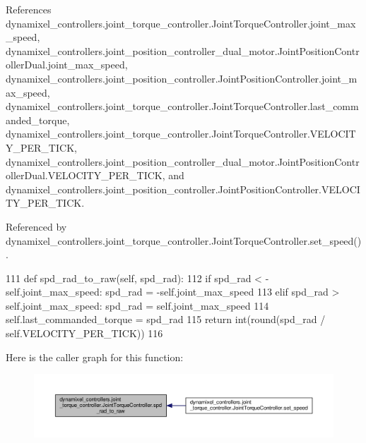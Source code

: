 References dynamixel\+\_\+controllers.\+joint\+\_\+torque\+\_\+controller.\+Joint\+Torque\+Controller.\+joint\+\_\+max\+\_\+speed, dynamixel\+\_\+controllers.\+joint\+\_\+position\+\_\+controller\+\_\+dual\+\_\+motor.\+Joint\+Position\+Controller\+Dual.\+joint\+\_\+max\+\_\+speed, dynamixel\+\_\+controllers.\+joint\+\_\+position\+\_\+controller.\+Joint\+Position\+Controller.\+joint\+\_\+max\+\_\+speed, dynamixel\+\_\+controllers.\+joint\+\_\+torque\+\_\+controller.\+Joint\+Torque\+Controller.\+last\+\_\+commanded\+\_\+torque, dynamixel\+\_\+controllers.\+joint\+\_\+torque\+\_\+controller.\+Joint\+Torque\+Controller.\+V\+E\+L\+O\+C\+I\+T\+Y\+\_\+\+P\+E\+R\+\_\+\+T\+I\+CK, dynamixel\+\_\+controllers.\+joint\+\_\+position\+\_\+controller\+\_\+dual\+\_\+motor.\+Joint\+Position\+Controller\+Dual.\+V\+E\+L\+O\+C\+I\+T\+Y\+\_\+\+P\+E\+R\+\_\+\+T\+I\+CK, and dynamixel\+\_\+controllers.\+joint\+\_\+position\+\_\+controller.\+Joint\+Position\+Controller.\+V\+E\+L\+O\+C\+I\+T\+Y\+\_\+\+P\+E\+R\+\_\+\+T\+I\+CK.



Referenced by dynamixel\+\_\+controllers.\+joint\+\_\+torque\+\_\+controller.\+Joint\+Torque\+Controller.\+set\+\_\+speed().


\begin{DoxyCode}
111     \textcolor{keyword}{def }spd\_rad\_to\_raw(self, spd\_rad):
112         \textcolor{keywordflow}{if} spd\_rad < -self.joint\_max\_speed: spd\_rad = -self.joint\_max\_speed
113         \textcolor{keywordflow}{elif} spd\_rad > self.joint\_max\_speed: spd\_rad = self.joint\_max\_speed
114         self.last\_commanded\_torque = spd\_rad
115         \textcolor{keywordflow}{return} int(round(spd\_rad / self.VELOCITY\_PER\_TICK))
116 
\end{DoxyCode}
Here is the caller graph for this function\+:
\nopagebreak
\begin{figure}[H]
\begin{center}
\leavevmode
\includegraphics[width=350pt]{db/d80/classdynamixel__controllers_1_1joint__torque__controller_1_1_joint_torque_controller_ac5eb1af408da423a97956bc896859db4_icgraph}
\end{center}
\end{figure}
\mbox{\label{classdynamixel__controllers_1_1joint__controller_1_1_joint_controller_a8da16a8b801f868a4de7c68d6adc851f}} 
